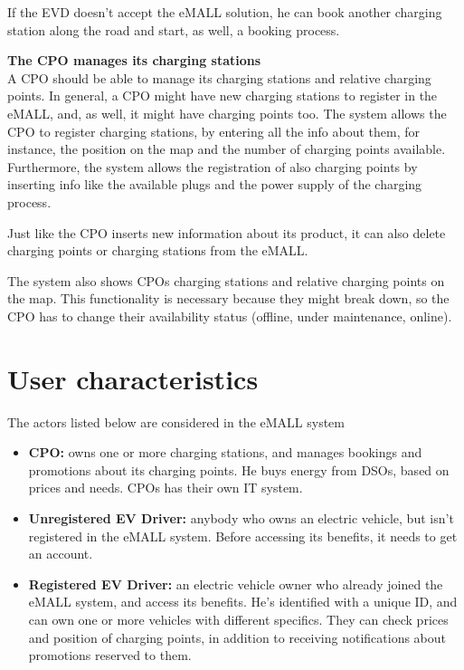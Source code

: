 If the EVD doesn't accept the eMALL solution, he can book another charging station along the road and start, as well, a booking process.

\textbf{The CPO manages its charging stations} \\
A CPO should be able to manage its charging stations and relative charging points.
In general, a CPO might have new charging stations to register in the eMALL, and, as well, it might have charging points too.
The system allows the CPO to register charging stations, by entering all the info about them, for instance, the position on the map and the number of charging points available.
Furthermore, the system allows the registration of also charging points by inserting info like the available plugs and the power supply of the charging process.

Just like the CPO inserts new information about its product, it can also delete charging points or charging stations from the eMALL\@.

The system also shows CPOs charging stations and relative charging points on the map.
This functionality is necessary because they might break down, so the CPO has to change their availability status (offline, under maintenance, online).


\section{User characteristics}
\label{sec:user_characteristics}%
The actors listed below are considered in the eMALL system
\begin{itemize}
    \item \textbf{CPO:} owns one or more charging stations, and manages bookings and promotions about its charging points.
    He buys energy from DSOs, based on prices and needs.
    CPOs has their own IT system.
    \item \textbf{Unregistered EV Driver:} anybody who owns an electric vehicle, but isn’t registered in the eMALL system.
    Before accessing its benefits, it needs to get an account.
    \item \textbf{Registered EV Driver:} an electric vehicle owner who already joined the eMALL system, and access its benefits.
    He’s identified with a unique ID, and can own one or more vehicles with different specifics.
    They can check prices and position of charging points, in addition to receiving notifications about promotions reserved to them.
\end{itemize}


